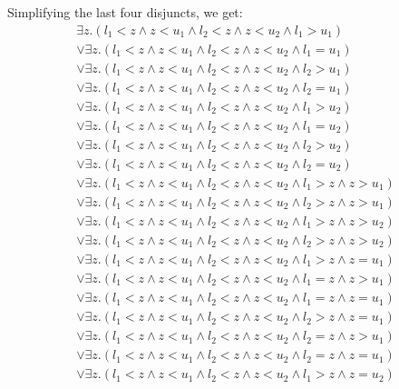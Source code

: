\documentclass[12pt,letterpaper, onecolumn]{exam}
\begin{document}
\begin{questions}
	Simplifying the last four disjuncts, we get:
	\begin{align*}
		\exists z. ( l_1 < z \land z < u_1 \land l_2 < z \land z < u_2 \land l_1 > u_1 ) \\
		\lor \exists z. ( l_1 < z \land z < u_1 \land l_2 < z \land z < u_2 \land l_1 = u_1 ) \\
		\lor \exists z. ( l_1 < z \land z < u_1 \land l_2 < z \land z < u_2 \land l_2 > u_1 ) \\
		\lor \exists z. ( l_1 < z \land z < u_1 \land l_2 < z \land z < u_2 \land l_2 = u_1 ) \\
		\lor \exists z. ( l_1 < z \land z < u_1 \land l_2 < z \land z < u_2 \land l_1 > u_2 ) \\
		\lor \exists z. ( l_1 < z \land z < u_1 \land l_2 < z \land z < u_2 \land l_1 = u_2 ) \\
		\lor \exists z. ( l_1 < z \land z < u_1 \land l_2 < z \land z < u_2 \land l_2 > u_2 ) \\
		\lor \exists z. ( l_1 < z \land z < u_1 \land l_2 < z \land z < u_2 \land l_2 = u_2 ) \\
		\lor \exists z. ( l_1 < z \land z < u_1 \land l_2 < z \land z < u_2 \land l_1 > z \land z > u_1 ) \\
		\lor \exists z. ( l_1 < z \land z < u_1 \land l_2 < z \land z < u_2 \land l_2 > z \land z > u_1 ) \\
		\lor \exists z. ( l_1 < z \land z < u_1 \land l_2 < z \land z < u_2 \land l_1 > z \land z > u_2 ) \\
		\lor \exists z. ( l_1 < z \land z < u_1 \land l_2 < z \land z < u_2 \land l_2 > z \land z > u_2 ) \\
		\lor \exists z. ( l_1 < z \land z < u_1 \land l_2 < z \land z < u_2 \land l_1 > z \land z = u_1 ) \\
		\lor \exists z. ( l_1 < z \land z < u_1 \land l_2 < z \land z < u_2 \land l_1 = z \land z > u_1 ) \\
		\lor \exists z. ( l_1 < z \land z < u_1 \land l_2 < z \land z < u_2 \land l_1 = z \land z = u_1 ) \\
		\lor \exists z. ( l_1 < z \land z < u_1 \land l_2 < z \land z < u_2 \land l_2 > z \land z = u_1 ) \\
		\lor \exists z. ( l_1 < z \land z < u_1 \land l_2 < z \land z < u_2 \land l_2 = z \land z > u_1 ) \\
		\lor \exists z. ( l_1 < z \land z < u_1 \land l_2 < z \land z < u_2 \land l_2 = z \land z = u_1 ) \\
		\lor \exists z. ( l_1 < z \land z < u_1 \land l_2 < z \land z < u_2 \land l_1 > z \land z = u_2 ) \\

\end{align*}
\end{questions}
\end{document}
